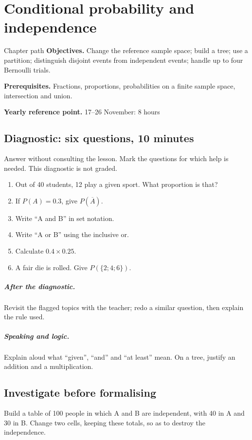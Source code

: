 \chapter{Conditional probability and independence}\label{C05}
\begin{repere}{Chapter path}
\textbf{Objectives.} Change the reference sample space; build a tree; use a partition; distinguish disjoint events from independent events; handle up to four Bernoulli trials.

\textbf{Prerequisites.} Fractions, proportions, probabilities on a finite sample space, intersection and union.

\textbf{Yearly reference point.} 17--26 November: 8 hours\end{repere}
\section*{Diagnostic: six questions, 10 minutes}\label{C05-D}
Answer without consulting the lesson. Mark the questions for which help is needed. This diagnostic is not graded.
\begin{enumerate}
\item Out of 40 students, 12 play a given sport. What proportion is that?
\item If $P(A)=0.3$, give $P(\overline A)$.
\item Write ``A and B'' in set notation.
\item Write ``A or B'' using the inclusive or.
\item Calculate $0.4\times0.25$.
\item A fair die is rolled. Give $P(\{2;4;6\})$.
\end{enumerate}
\paragraph{After the diagnostic.} Revisit the flagged topics with the teacher; redo a similar question, then explain the rule used.
\paragraph{Speaking and logic.} Explain aloud what ``given'', ``and'' and ``at least'' mean. On a tree, justify an addition and a multiplication.
\clearpage
\section*{Investigate before formalising}\label{C05-RECH}
Build a table of 100 people in which A and B are independent, with 40 in A and 30 in B. Change two cells, keeping these totals, so as to destroy the independence.
